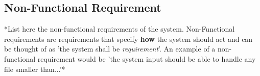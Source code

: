 \documentclass{article}
\begin{document}
\subsection{Non-Functional Requirement}

*List here the non-functional requirements of the system. Non-Functional
requirements are requirements that specify \textbf{how} the system should act
and can be thought of as 'the system shall be \textit{requirement}'. An example
of a non-functional requirement would be 'the system input should be able to
handle any file smaller than...'*
\end{document}
